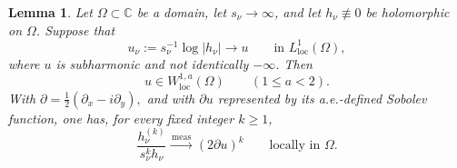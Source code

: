 \documentclass[12pt,letterpaper,reqno]{amsart}
\newtheorem{lem}[thm]{Lemma}
\theoremstyle{definition}
\numberwithin{equation}{section}
\newcommand{\C}{\mathbb C}
\newcommand{\loc}{\mathrm{loc}}
\newcommand{\convmeas}{\xrightarrow{\,\mathrm{meas}\,}}
\begin{document}
\begin{lem}\label{lem:logderivlimit}
Let \(\Omega\subset\C\) be a domain, let \(s_\nu\to\infty\), and let
\(h_\nu\not\equiv0\) be holomorphic on \(\Omega\). Suppose that
\begin{equation}\label{eq:log-limit-assumption}
 u_\nu:=s_\nu^{-1}\log|h_\nu|
 \longrightarrow u
 \qquad\text{in }L^1_{\loc}(\Omega),
\end{equation}
where \(u\) is subharmonic and not identically \(-\infty\). Then
\begin{equation}\label{eq:sobolev-limit}
 u\in W^{1,a}_{\loc}(\Omega)\qquad(1\leq a<2).
\end{equation}
With
$
 \partial=\tfrac12(\partial_x-i\partial_y),
$
and with \(\partial u\) represented by its a.e.-defined Sobolev function,
one has, for every fixed integer \(k\ge1\),
\begin{equation}\label{eq:logderivlimit}
 \frac{h_\nu^{(k)}}{s_\nu^kh_\nu}
 \convmeas (2\partial u)^k
 \qquad\text{locally in }\Omega.
\end{equation}
\end{lem}
\end{document}
